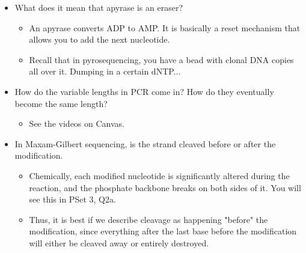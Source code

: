 \documentclass[../notes.tex]{subfiles}
\begin{document}
\begin{itemize}
    \item What does it mean that apyrase is an eraser?
    \begin{itemize}
        \item An apyrase converts ADP to AMP. It is basically a reset mechanism that allows you to add the next nucleotide.
        \item Recall that in pyrosequencing, you have a bead with clonal DNA copies all over it. Dumping in a certain dNTP...
    \end{itemize}
    \item How do the variable lengths in PCR come in? How do they eventually become the same length?
    \begin{itemize}
        \item See the videos on Canvas.
    \end{itemize}
    \item In Maxam-Gilbert sequencing, is the strand cleaved before or after the modification.
    \begin{itemize}
        \item Chemically, each modified nucleotide is significantly altered during the reaction, and the phosphate backbone breaks on both sides of it. You will see this in PSet 3, Q2a.
        \item Thus, it is best if we describe cleavage as happening "before" the modification, since everything after the last base  before the modification will either be cleaved away or entirely destroyed.
    \end{itemize}
\end{itemize}
\end{document}
